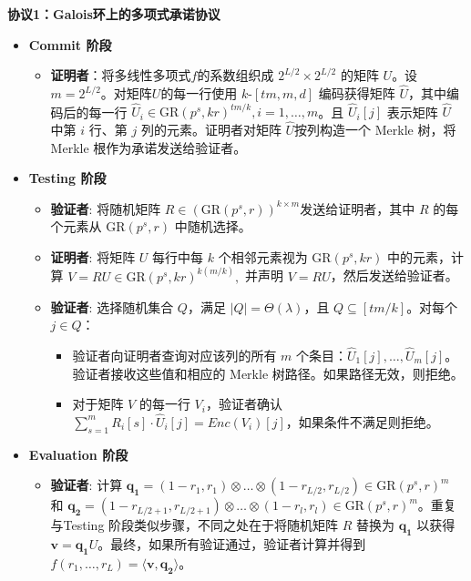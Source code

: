 \documentclass{article}
\begin{document}
\begin{tcolorbox}[
  width=\textwidth,
  colframe=black,
  colback=white,
  sharp corners,
  boxsep=2pt,
  left=2pt,right=2pt,top=3pt,bottom=3pt
]



\textbf{协议1：Galois环上的多项式承诺协议}

\begin{itemize}
  \item \textbf{Commit 阶段}
  \begin{itemize}
    \item \textbf{证明者}：将多线性多项式\( f \)的系数组织成 \( 2^{L/2} \times 2^{L/2} \) 的矩阵 \( U \)。设 \( m = 2^{L/2} \)。对矩阵\( U \)的每一行使用 \( k \)-\( [tm,m, d ]\) 编码获得矩阵 \( \hat{U} \)，其中编码后的每一行 \( \hat{U}_i \in \mathrm{GR}(p^s, kr)^{tm/k} ,i=1,\ldots,m\)。且 \( \hat{U}_i[j] \) 表示矩阵 \( \hat{U} \) 中第 \( i \) 行、第 \( j \) 列的元素。证明者对矩阵 \( \hat{U} \)按列构造一个 Merkle 树，将 Merkle 根作为承诺发送给验证者。
  \end{itemize}
  
  \item \textbf{Testing 阶段}
  \begin{itemize}
    \item \textbf{验证者}: 将随机矩阵 \( R \in (\mathrm{GR}(p^s, r))^{k \times m} \)发送给证明者，其中 \( R \) 的每个元素从 \( \mathrm{GR}(p^s, r) \) 中随机选择。
    
    \item \textbf{证明者}: 将矩阵 \( U \) 每行中每 \( k \) 个相邻元素视为 \( \mathrm{GR}(p^s, kr) \) 中的元素，计算
    \(V = RU \in \mathrm{GR}(p^s, kr)^{k(m/k)},\)
    并声明 \( V = RU \)，然后发送给验证者。
    
    \item \textbf{验证者}: 选择随机集合 \( Q \)，满足 \( |Q| = \Theta(\lambda) \)，且 \( Q \subseteq [tm/k] \)。对每个 \( j \in Q \)：
    \begin{itemize}
      \item 验证者向证明者查询对应该列的所有 \( m \) 个条目：\( \hat{U}_1[j], \dots, \hat{U}_m[j] \)。验证者接收这些值和相应的 Merkle 树路径。如果路径无效，则拒绝。 \item 对于矩阵 \( V \) 的每一行 \( V_i \)，验证者确认 \( \sum_{s=1}^{m} R_i[s] \cdot \hat{U}_i[j] = Enc(V_i)[j] \)，如果条件不满足则拒绝。
    \end{itemize}
  \end{itemize}
  
  \item \textbf{Evaluation 阶段}
  \begin{itemize}
    \item \textbf{验证者}: 计算 \( \mathbf{q_1} = (1-r_1, r_1) \otimes \dots \otimes (1-r_{L/2}, r_{L/2}) \in \text{GR}(p^s, r)^m \) 和 \( \mathbf{q_2} = (1-r_{L/2+1}, r_{L/2+1}) \otimes \dots \otimes (1-r_l, r_l) \in \text{GR}(p^s, r)^m \)。重复与Testing 阶段类似步骤，不同之处在于将随机矩阵 \( R \) 替换为 \( \mathbf{q_1} \) 以获得 \( \mathbf{v} =\mathbf{q_1}U\)。最终，如果所有验证通过，验证者计算并得到 \( f(r_1, \dots, r_L) = \langle\mathbf{v}, \mathbf{q_2}\rangle \)。
  \end{itemize}


\end{itemize}
\end{tcolorbox}
\end{document}
